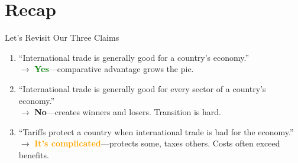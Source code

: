 \documentclass[9pt,english,aspectratio=169]{beamer}
\begin{document}
\section{Recap}

\begin{frame}{Let's Revisit Our Three Claims}

  \vspace{0.5em}
  \begin{enumerate}
    \item ``International trade is generally good for a country's economy.''\\
          $\rightarrow$ \textcolor{green}{\textbf{Yes}}---comparative advantage grows the pie.

    \vspace{1em}
    \item ``International trade is generally good for every sector of a country's economy.''\\
          $\rightarrow$ \textcolor{vermillion}{\textbf{No}}---creates winners and losers. Transition is hard.

    \vspace{1em}
    \item ``Tariffs protect a country when international trade is bad for the economy.''\\
          $\rightarrow$ \textcolor{orange}{\textbf{It's complicated}}---protects some, taxes others. Costs often exceed benefits.
  \end{enumerate}


\end{frame}
\end{document}
